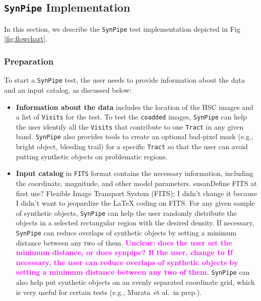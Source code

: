 \documentclass[useamsfonts]{pasj01}
\def\etal{{\ et al.~}}
\def\synpipe{\texttt{SynPipe}}
\def\tract{\texttt{Tract}}
\def\visits{\texttt{Visits}}
\newcommand{\susan}[1]{\textcolor{magenta} {\textbf{#1}}}
\begin{document}

\subsection{\synpipe{} Implementation }
    \label{ssec:flowchart}

    In this section, we describe the \synpipe{} test implementation depicted in Fig \ref{fig:flowchart}.

\subsubsection{Preparation}
    \label{sssec:prep}

    To start a \synpipe{} test, the user needs to provide information about the data and an input catalog, as discussed below:

    \begin{itemize}

        \item \textbf{Information about the data} includes the
            location of the HSC images and a list of \visits{} for the
            test.
            To test the \texttt{coadded} images, \synpipe{} can help the user identify
            all the \visits{} that contribute to one \tract{} in any given
            band.
            \synpipe{} also provides tools to create an optional bad-pixel mask (e.g., bright
            object, bleeding trail) for a specific \tract{} so that the user can avoid
            putting synthetic objects on problematic regions.

        \item \textbf{Input catalog} in  \texttt{FITS} format contains the necessary
            information, including the coordinate, magnitude, and other model parameters.  susan{Define FITS at first use? Flexible Image Transport System (FITS); I didn't change it because I didn't want to jeopardize the LaTeX coding on FITS.} 
            For any given sample of synthetic objects, \synpipe{} can help the user randomly
            distribute the objects in a selected rectangular region with the desired 
            density.
            If necessary,  \synpipe{}  can reduce overlaps of synthetic objects by setting a minimum distance between any two of them. \susan{Unclear: does the user set the minimum distance, or does synpipe? If the user, change to If necessary,  the user can reduce overlaps of synthetic objects by setting a minimum distance between any two of them. } 
            \synpipe{} can also help put synthetic objects on an evenly separated
            coordinate grid, which is very useful for certain tests
            (e.g., Murata\etal in prep.).

    \end{itemize}
\end{document}
